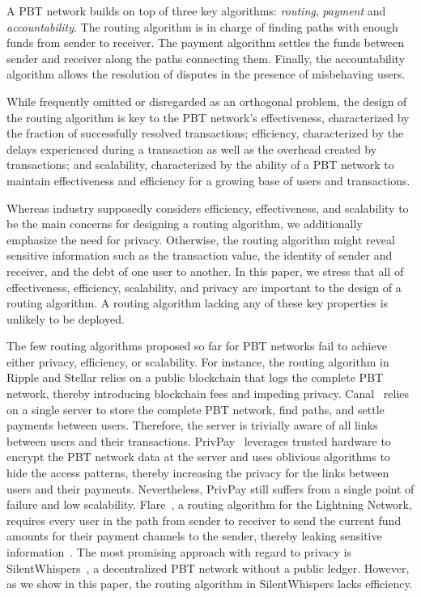 A PBT network builds on top of three key algorithms: \emph{routing},  
\emph{payment} and \emph{accountability}. The routing algorithm is in charge of finding paths with 
enough funds from sender to receiver. The payment algorithm settles the funds between 
sender and receiver along the paths connecting them. Finally, the accountability algorithm 
allows the resolution of disputes in the presence of misbehaving users. 

While frequently omitted or disregarded as 
an orthogonal problem, the design of the routing algorithm is key to the PBT network's effectiveness, 
characterized by the fraction of successfully resolved transactions; efficiency, characterized by the delays experienced during a transaction as well as the overhead created by transactions; and scalability, 
 characterized  by the ability of a PBT network to maintain effectiveness and efficiency for 
 a growing base of users and transactions. 
 
Whereas industry supposedly considers efficiency, effectiveness, and scalability to be the main concerns for designing a routing algorithm, we additionally emphasize the need for privacy. 
Otherwise, the routing algorithm might reveal sensitive information such as the transaction value, the identity of sender and receiver, and the debt of one user to another.  
In this paper, we stress that all of effectiveness, efficiency, scalability, and privacy
are important to the design of a routing algorithm. 
A routing algorithm lacking any of these key properties is unlikely to be deployed.  

 

The few routing algorithms proposed so far for PBT networks fail to achieve either 
privacy, efficiency, or scalability. For instance, the routing algorithm in Ripple and Stellar 
relies on a public blockchain that logs the complete PBT network, 
thereby introducing blockchain fees and impeding privacy. 
Canal~\cite{viswanath2012canal} relies on a single server to store the complete PBT network, 
 find paths, and settle payments between users. Therefore, the server is 
trivially aware of all links between users and their transactions. 
PrivPay~\cite{moreno15privpay} leverages trusted hardware to encrypt the PBT 
network data at the server and uses oblivious algorithms to hide the access patterns, thereby 
increasing the privacy for the links between users and their payments. Nevertheless, PrivPay 
 still suffers from a single point of failure and low scalability. Flare~\cite{prihodko2016flare}, 
 a routing algorithm for the Lightning Network, requires every user in the path from sender to 
 receiver to send the current fund amounts for their payment channels to the sender, thereby leaking 
 sensitive information~\cite{prihodko2016flare}.
The most promising approach with regard to privacy is SilentWhispers~\cite{malavolta17silent}, 
a decentralized PBT network without a public ledger. However, as we show in this paper, 
the routing algorithm in SilentWhispers lacks efficiency. 


